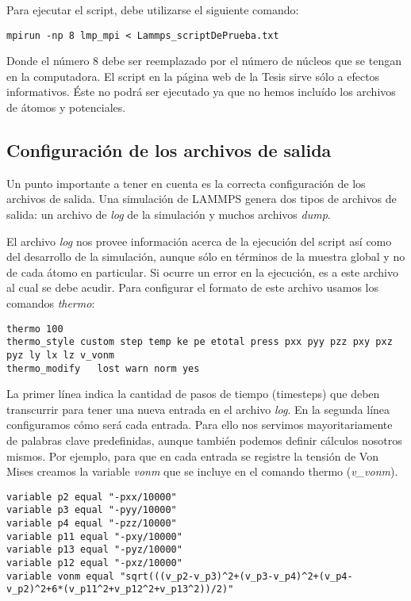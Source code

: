 Para ejecutar el script, debe utilizarse el siguiente comando:

\begin{lstlisting}
mpirun -np 8 lmp_mpi < Lammps_scriptDePrueba.txt 
\end{lstlisting}

Donde el número 8 debe ser reemplazado por el número de núcleos que se tengan en la computadora. El script en la página web de la Tesis sirve sólo a efectos informativos. Éste no podrá ser ejecutado ya que no hemos incluído los archivos de átomos y potenciales.

\subsection{Configuración de los archivos de salida}
\label{AA_2_1}

Un punto importante a tener en cuenta es la correcta configuración de los archivos de salida. Una simulación de LAMMPS genera dos tipos de archivos de salida: un archivo de \textit{log} de la simulación y muchos archivos \textit{dump}.

El archivo \textit{log} nos provee información acerca de la ejecución del script así como del desarrollo de la simulación, aunque sólo en términos de la muestra global y no de cada átomo en particular. Si ocurre un error en la ejecución, es a este archivo al cual se debe acudir. Para configurar el formato de este archivo usamos los comandos \textit{thermo}:

\begin{lstlisting}
thermo 100
thermo_style custom step temp ke pe etotal press pxx pyy pzz pxy pxz pyz ly lx lz v_vonm
thermo_modify	lost warn norm yes
\end{lstlisting}

La primer línea indica la cantidad de pasos de tiempo (timesteps) que deben transcurrir para tener una nueva entrada en el archivo \textit{log}. En la segunda línea configuramos cómo será cada entrada. Para ello nos servimos mayoritariamente de palabras clave predefinidas, aunque también podemos definir cálculos nosotros mismos. Por ejemplo, para que en cada entrada se registre la tensión de Von Mises creamos la variable \textit{vonm} que se incluye en el comando thermo (\textit{v\_vonm}).

\begin{lstlisting}
variable p2 equal "-pxx/10000"
variable p3 equal "-pyy/10000"
variable p4 equal "-pzz/10000"
variable p11 equal "-pxy/10000"
variable p13 equal "-pyz/10000"
variable p12 equal "-pxz/10000"
variable vonm equal "sqrt(((v_p2-v_p3)^2+(v_p3-v_p4)^2+(v_p4-v_p2)^2+6*(v_p11^2+v_p12^2+v_p13^2))/2)"
\end{lstlisting}

